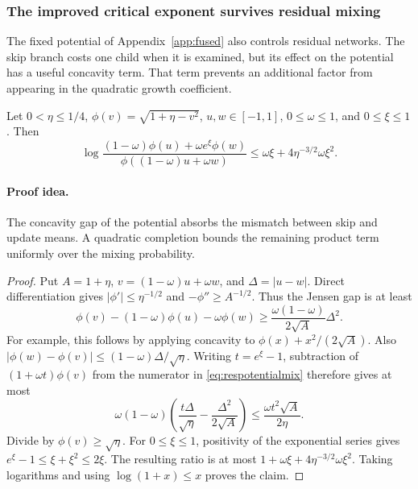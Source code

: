 \subsubsection{The improved critical exponent survives residual mixing}
\label{sec:residualfused}

The fixed potential of Appendix~\ref{app:fused} also controls
residual networks. The skip branch costs one child when it is
examined, but its effect on the potential has a useful concavity
term. That term prevents an additional factor from appearing in
the quadratic growth coefficient.

\begin{lemma}
\label{lem:respotentialmix}
Let $0<\eta\le1/4$, $\phi(v)=\sqrt{1+\eta-v^2}$,
$u,w\in[-1,1]$, $0\le\omega\le1$, and $0\le\xi\le1$.
Then
\begin{equation}\label{eq:respotentialmix}
\log\frac{(1-\omega)\phi(u)+\omega e^\xi\phi(w)}
              {\phi((1-\omega)u+\omega w)}
\le\omega\xi+4\eta^{-3/2}\omega\xi^2.
\end{equation}
\end{lemma}
\paragraph{Proof idea.}
The concavity gap of the potential absorbs the mismatch between skip and
update means. A quadratic completion bounds the remaining product term
uniformly over the mixing probability.

\begin{proof}
Put $A=1+\eta$, $v=(1-\omega)u+\omega w$, and
$\Delta=|u-w|$. Direct differentiation gives
$|\phi'|\le\eta^{-1/2}$ and $-\phi''\ge A^{-1/2}$.
Thus the Jensen gap is at least
\[
\phi(v)-(1-\omega)\phi(u)-\omega\phi(w)
\ge\frac{\omega(1-\omega)}{2\sqrt A}\Delta^2.
\]
For example, this follows by applying concavity to
$\phi(x)+x^2/(2\sqrt A)$.
Also $|\phi(w)-\phi(v)|\le(1-\omega)\Delta/\sqrt\eta$.
Writing $t=e^\xi-1$, subtraction of
$(1+\omega t)\phi(v)$ from the numerator in
\eqref{eq:respotentialmix} therefore gives at most
\[
\omega(1-\omega)
 \left(\frac{t\Delta}{\sqrt\eta}
               -\frac{\Delta^2}{2\sqrt A}\right)
\le\frac{\omega t^2\sqrt A}{2\eta}.
\]
Divide by $\phi(v)\ge\sqrt\eta$.
For $0\le\xi\le1$, positivity of the exponential series gives
$e^\xi-1\le\xi+\xi^2\le2\xi$.
The resulting ratio is at most
$1+\omega\xi+4\eta^{-3/2}\omega\xi^2$.
Taking logarithms and using $\log(1+x)\le x$ proves the claim.
\end{proof}

